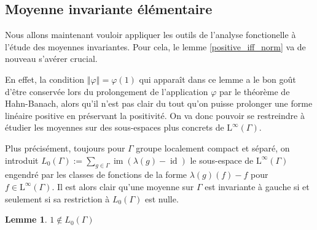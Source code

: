 \documentclass[a4paper,12pt]{article}
\newtheorem{lemma}[theorem]{Lemme}
\newcommand{\norm}[1]{\left\Vert #1\right\Vert}
\newcommand{\ssi}{si et seulement si }
\DeclareMathOperator{\id}{id}
\DeclareMathOperator{\Ima}{im}
\begin{document}
\subsection{Moyenne invariante élémentaire}

Nous allons maintenant vouloir appliquer les outils de l'analyse fonctionelle à l'étude des moyennes invariantes.
Pour cela, le lemme \ref{positive_iff_norm} va de nouveau s'avérer crucial.

En effet, la condition $\norm\varphi = \varphi(1)$ qui apparaît dans ce lemme a le bon goût d'être conservée lors du prolongement de l'application 
$\varphi$ par le théorème de Hahn-Banach, alors qu'il n'est pas clair du tout qu'on puisse prolonger une forme linéaire positive en préservant 
la positivité. On va donc pouvoir se restreindre à étudier les moyennes sur des sous-espaces plus concrets de $\mathrm{L}^\infty(\Gamma)$.

Plus précisément, toujours pour $\Gamma$ groupe localement compact et séparé, on introduit $L_0(\Gamma) := \sum_{g\in\Gamma} \Ima(\lambda(g) - \id)$ le sous-espace de 
$\mathrm{L}^\infty(\Gamma)$ engendré par les classes de fonctions de la forme $\lambda(g)(f) - f$ pour $f\in \mathrm{L}^\infty(\Gamma)$. 
Il est alors clair qu'une moyenne sur $\Gamma$ est invariante à gauche \ssi sa restriction à $L_0(\Gamma)$ est nulle. 

\begin{lemma}\label{one_not_mem_L0}
    $1\notin L_0(\Gamma)$
\end{lemma}
\end{document}
